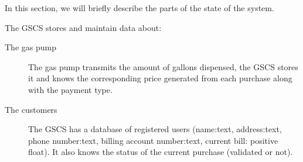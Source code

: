 In this section, we will briefly describe the parts of the state of the
system. \newline

The GSCS stores and maintain data about:

\begin{description}
    \item[The gas pump] The gas pump transmits the amount of gallons dispensed,
    the GSCS stores it and knows the corresponding price generated from
    each purchase along with the payment type.

    \item[The customers] The GSCS has a database of registered users
    (name:text, address:text, phone number:text, billing account number:text, current bill: positive float). It also knows the status
    of the current purchase (validated or not).
\end{description}
